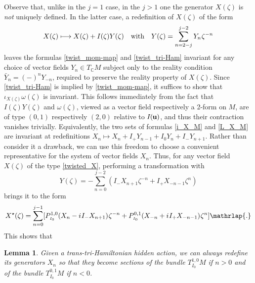 \documentclass[11pt]{amsart}
\newtheorem{lemma}[theorem]{Lemma}
\theoremstyle{remark}
\theoremstyle{remark}
\theoremstyle{definition}
\theoremstyle{definition}
\theoremstyle{definition}
\newcommand{\IU}{I\nhp(\nhp\mathbf{u}\hspace{-0.2pt})} %
\newcommand{\Io}{{\scriptscriptstyle I_0}}
\newcommand{\0}{{\scriptstyle 0'}} %
\newcommand{\1}{{\scriptstyle 1'}}
\newcommand{\hp}{\hspace{0.5pt}} %
\newcommand{\nhp}{\hspace{-0.5pt}} %
\begin{document}
Observe that, unlike in the $j=1$ case, in the $j>1$ one the generator $X(\zeta)$ is \textit{not} uniquely defined. In the latter case, a redefinition of $X(\zeta)$ of the form %
\begin{equation}
X(\zeta) \longmapsto X(\zeta) + I(\zeta)Y(\zeta)
\quad\text{with}\quad
Y(\zeta) = \sum_{n =2-j}^{j-2} Y_n \hp \zeta^{-n}
\end{equation}
leaves the formulas \eqref{twist_mom-map} and \eqref{twist_tri-Ham} invariant for any choice of vector fields $Y_n \in T_{\mathbb{C}}M$ subject only to the reality condition $\bar{Y}_{n} = (-)^n Y_{-n} $, required to preserve the reality property of $X(\zeta)$. Since \eqref{twist_tri-Ham} is implied by \eqref{twist_mom-map}, it suffices to show that $\iota_{X(\zeta)}\omega(\zeta)$ is invariant. This follows immediately from the fact that $I(\zeta)Y(\zeta)$ and $\omega(\zeta)$, viewed as a vector field respectively a 2-form on $M$, are of type $(0,1)$ respectively $(2,0)$ relative to $\IU$, and thus their contraction vanishes trivially. Equivalently, the two sets of formulas \eqref{i_X_M} and \eqref{L_X_M}  are invariant at redefinitions \mbox{$X_n \longmapsto X_n + I_+Y_{n-1} + I_0 Y_n + I_- Y_{n+1}$}. %
Rather than consider it a drawback, we can use this freedom to choose a convenient representative for the system of vector fields $X_n$. Thus, for any vector field $X(\zeta)$ of the type \eqref{twisted_X}, performing a transformation with 
\begin{equation}
Y(\zeta) = - \sum_{n=0}^{j-2} ( I_-X_{n+1} \zeta^{-n} + I_+ X_{-n-1} \zeta^n)
\end{equation}
brings it to the form
\begin{equation}
X^{\star}(\zeta) = \sum_{n=0}^{j-1} [P^{1,0}_{\Io} (X_n - i \hp I_-X_{n+1}) \hp \zeta^{-n } + P^{0,1}_{\Io} (X_{-n} + i \hp I_+X_{-n-1}) \hp \zeta^n] \mathrlap{.}
\end{equation}
This shows that

\begin{lemma} \label{canon_pres}
Given a trans-tri-Hamiltonian hidden action, we can always redefine its generators $X_n$ so that they become sections of the bundle $T^{1,0}_{\Io}M$ if \mbox{$n > 0$} and of the bundle $T^{0,1}_{\Io}M$ if \mbox{$n < 0$}.
\end{lemma}
\end{document}
